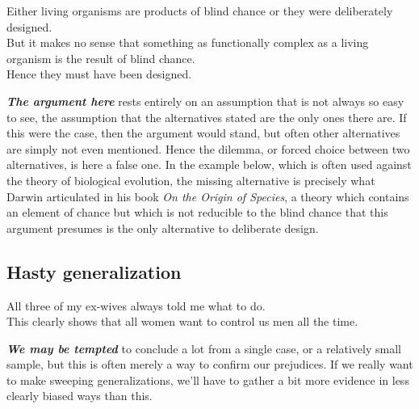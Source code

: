 \documentclass[
  12pt, openany]{book}
\begin{document}
\begin{center}

\begin{argument}

Either living organisms are products of blind chance or they were deliberately designed.\\
But it makes no sense that something as functionally complex as a living organism is the result of blind chance.\\

Hence they must have been designed.

\end{argument}

\end{center}

\textbf{\emph{The argument here}} rests entirely on an assumption that is not always so easy to see, the assumption that the alternatives stated are the only ones there are. If this were the case, then the argument would stand, but often other alternatives are simply not even mentioned. Hence the dilemma, or forced choice between two alternatives, is here a false one. In the example below, which is often used against the theory of biological evolution, the missing alternative is precisely what Darwin articulated in his book \emph{On the Origin of Species}, a theory which contains an element of chance but which is not reducible to the blind chance that this argument presumes is the only alternative to deliberate design.

\hypertarget{hasty-generalization}{%
\subsection*{Hasty generalization}\label{hasty-generalization}}


\begin{center}

\begin{argument}

All three of my ex-wives always told me what to do.\\

This clearly shows that all women want to control us men all the time.

\end{argument}

\end{center}

\textbf{\emph{We may be tempted}} to conclude a lot from a single case, or a relatively small sample, but this is often merely a way to confirm our prejudices. If we really want to make sweeping generalizations, we'll have to gather a bit more evidence in less clearly biased ways than this.
\end{document}
